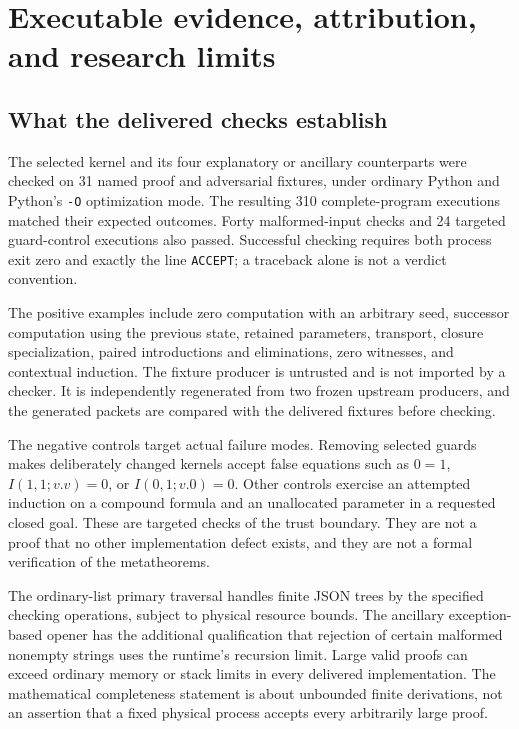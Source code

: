 \section{Executable evidence, attribution, and research limits}
\label{sec:validation}

\subsection{What the delivered checks establish}

The selected kernel and its four explanatory or ancillary counterparts
were checked on 31 named proof and adversarial fixtures, under ordinary
Python and Python's \texttt{-O} optimization mode. The resulting 310
complete-program executions matched their expected outcomes. Forty
malformed-input checks and 24 targeted guard-control executions also
passed. Successful checking requires both process exit zero and exactly
the line \texttt{ACCEPT}; a traceback alone is not a verdict convention.

The positive examples include zero computation with an arbitrary seed,
successor computation using the previous state, retained parameters,
transport, closure specialization, paired introductions and eliminations,
zero witnesses, and contextual induction. The fixture producer is
untrusted and is not imported by a checker. It is independently
regenerated from two frozen upstream producers, and the generated
packets are compared with the delivered fixtures before checking.

The negative controls target actual failure modes. Removing selected
guards makes deliberately changed kernels accept false equations such
as $0=1$, $I(1,1;v.v)=0$, or $I(0,1;v.0)=0$. Other controls exercise
an attempted induction on a compound formula and an unallocated
parameter in a requested closed goal. These are targeted checks of the
trust boundary. They are not a proof that no other implementation defect
exists, and they are not a formal verification of the metatheorems.

The ordinary-list primary traversal handles finite JSON trees by the
specified checking operations, subject to physical resource bounds.
The ancillary exception-based opener has the additional qualification
that rejection of certain malformed nonempty strings uses the runtime's
recursion limit. Large valid proofs can exceed ordinary memory or stack
limits in every delivered implementation. The mathematical completeness
statement is about unbounded finite derivations, not an assertion that a
fixed physical process accepts every arbitrarily large proof.

